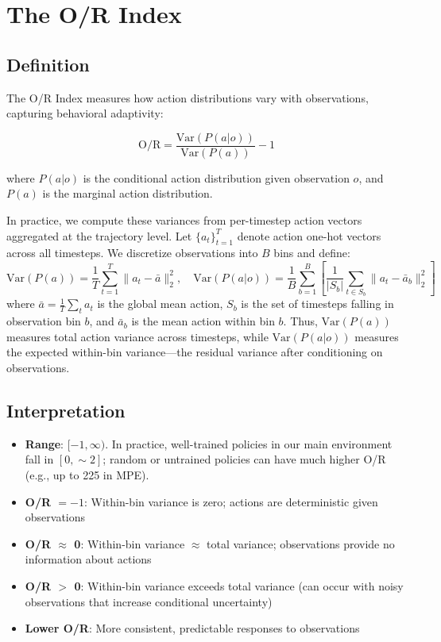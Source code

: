 \documentclass[twoside]{article}
\newcommand{\ORIndex}{O/R Index}
\theoremstyle{remark}
\begin{document}
\section{The O/R Index}

\subsection{Definition}

The \ORIndex{} measures how action distributions vary with observations, capturing behavioral adaptivity:

\begin{equation}
\text{O/R} = \frac{\text{Var}(P(a|o))}{\text{Var}(P(a))} - 1
\label{eq:or_definition}
\end{equation}

where $P(a|o)$ is the conditional action distribution given observation $o$, and $P(a)$ is the marginal action distribution.

In practice, we compute these variances from per-timestep action vectors aggregated at the trajectory level. Let $\{a_t\}_{t=1}^T$ denote action one-hot vectors across all timesteps. We discretize observations into $B$ bins and define:
\begin{equation}
\text{Var}(P(a)) = \frac{1}{T} \sum_{t=1}^{T} \|a_t - \bar{a}\|_2^2, \quad
\text{Var}(P(a|o)) = \frac{1}{B} \sum_{b=1}^{B} \left[ \frac{1}{|S_b|} \sum_{t \in S_b} \|a_t - \bar{a}_b\|_2^2 \right]
\end{equation}
where $\bar{a} = \frac{1}{T}\sum_t a_t$ is the global mean action, $S_b$ is the set of timesteps falling in observation bin $b$, and $\bar{a}_b$ is the mean action within bin $b$. Thus, $\text{Var}(P(a))$ measures total action variance across timesteps, while $\text{Var}(P(a|o))$ measures the expected within-bin variance—the residual variance after conditioning on observations.

\subsection{Interpretation}

\begin{itemize}
    \item \textbf{Range}: $[-1, \infty)$. In practice, well-trained policies in our main environment fall in $[0, \sim\!2]$; random or untrained policies can have much higher O/R (e.g., up to 225 in MPE).
    \item \textbf{O/R $= -1$}: Within-bin variance is zero; actions are deterministic given observations
    \item \textbf{O/R $\approx$ 0}: Within-bin variance $\approx$ total variance; observations provide no information about actions
    \item \textbf{O/R $>$ 0}: Within-bin variance exceeds total variance (can occur with noisy observations that increase conditional uncertainty)
    \item \textbf{Lower O/R}: More consistent, predictable responses to observations
\end{itemize}
\end{document}
